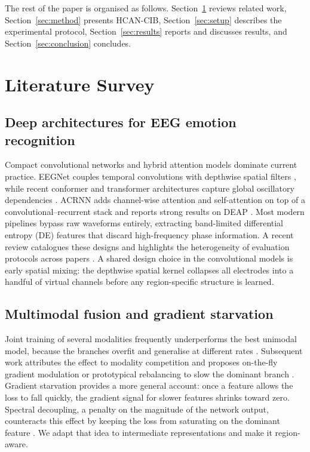 \documentclass[a4paper,fleqn]{cas-sc}
\begin{document}
The rest of the paper is organised as follows. Section~\ref{sec:related} reviews related work, Section~\ref{sec:method} presents HCAN-CIB, Section~\ref{sec:setup} describes the experimental protocol, Section~\ref{sec:results} reports and discusses results, and Section~\ref{sec:conclusion} concludes.

\section{Literature Survey}
\label{sec:related}

\subsection{Deep architectures for EEG emotion recognition}
Compact convolutional networks and hybrid attention models dominate current practice. EEGNet couples temporal convolutions with depthwise spatial filters \citep{lawhern2018eegnet}, while recent conformer and transformer architectures capture global oscillatory dependencies \citep{song2023conformer}. ACRNN adds channel-wise attention and self-attention on top of a convolutional--recurrent stack and reports strong results on DEAP \citep{tao2020acrnn}. Most modern pipelines bypass raw waveforms entirely, extracting band-limited differential entropy (DE) features \citep{liu2022comparing,lu2023cross} that discard high-frequency phase information. A recent review catalogues these designs and highlights the heterogeneity of evaluation protocols across papers \citep{li2022tutorial}. A shared design choice in the convolutional models is early spatial mixing: the depthwise spatial kernel collapses all electrodes into a handful of virtual channels before any region-specific structure is learned.

\subsection{Multimodal fusion and gradient starvation}
Joint training of several modalities frequently underperforms the best unimodal model, because the branches overfit and generalise at different rates \citep{huang2022modality,zhou2023modality}. Subsequent work attributes the effect to modality competition and proposes on-the-fly gradient modulation or prototypical rebalancing to slow the dominant branch \citep{peng2022balanced,fan2023pmr}. Gradient starvation provides a more general account: once a feature allows the loss to fall quickly, the gradient signal for slower features shrinks toward zero. Spectral decoupling, a penalty on the magnitude of the network output, counteracts this effect by keeping the loss from saturating on the dominant feature \citep{pezeshki2021gradient}. We adapt that idea to intermediate representations and make it region-aware.
\end{document}
